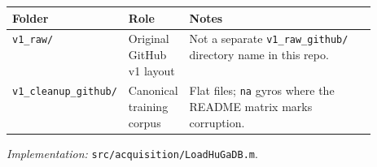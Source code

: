 \documentclass[11pt]{article}
\begin{document}
\vspace{0.8em}
\begin{center}
\small
\begin{tabular}{@{}llp{0.52\linewidth}@{}}
  \toprule
  \textbf{Folder} & \textbf{Role} & \textbf{Notes} \\
  \midrule
  \texttt{v1\_raw/} & Original GitHub v1 layout & Not a separate \texttt{v1\_raw\_github/} directory name in this repo. \\
  \texttt{v1\_cleanup\_github/} & Canonical training corpus & Flat files; \texttt{na} gyros where the README matrix marks corruption. \\
  \bottomrule
\end{tabular}
\end{center}

\vspace{0.4em}
\noindent\footnotesize\textit{Implementation:} \texttt{src/acquisition/LoadHuGaDB.m}.
\end{document}

